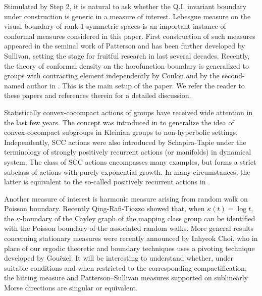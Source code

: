\documentclass{amsart}
\theoremstyle{definition}
\theoremstyle{remark}
\begin{document}
Stimulated by Step 2, it is natural to ask whether the Q.I. invariant boundary under construction is generic in a measure of interest. Lebesgue measure on the visual boundary of rank-1 symmetric spaces is an important instance of conformal measures considered in this paper. First construction of such measures appeared in the seminal work of Patterson \cite{Patt} and has been further developed by Sullivan, setting the stage  for fruitful research in last several decades. Recently, the theory of conformal density on the horofunction boundary is generalized to  groups with contracting element independently  by Coulon \cite{Coulon22} and by the second-named author in \cite{YANG22}. This is the main setup of the paper. We refer the reader to these papers and references therein for a detailed discussion.  

Statistically convex-cocompact actions of groups have received wide attention in the last few years. The concept was introduced in \cite{YANG10} to generalize the idea of convex-cocompact subgroups in Kleinian groups to non-hyperbolic settings. Independently, SCC actions were also introduced by Schapira-Tapie \cite{ST21} under the terminology of strongly positively recurrent actions (or manifolds) in dynamical system. The class of SCC  actions encompasses many examples, but forms a strict subclass of actions with purely exponential growth. In many circumstances, the latter is  equivalent to the so-called positively recurrent actions in \cite{PS18}. 




Another measure of interest is harmonic measure arising from random walk on Poisson boundary.  Recently Qing-Rafi-Tiozzo \cite{QRT2} showed that, when $\kappa(t)=\log t$, the $\kappa$-boundary of the Cayley graph of the mapping class group can be identified with the Poisson boundary of the associated random walks. More general results concerning stationary measures were recently announced by Inhyeok Choi, who in place of our ergodic theoretic and boundary techniques uses a pivoting technique developed by Gou\"ezel. It will be interesting to understand whether, under suitable conditions and when restricted to the corresponding compactification, the hitting measure and Patterson–Sullivan measures supported on sublinearly Morse directions are singular or equivalent.
\end{document}
